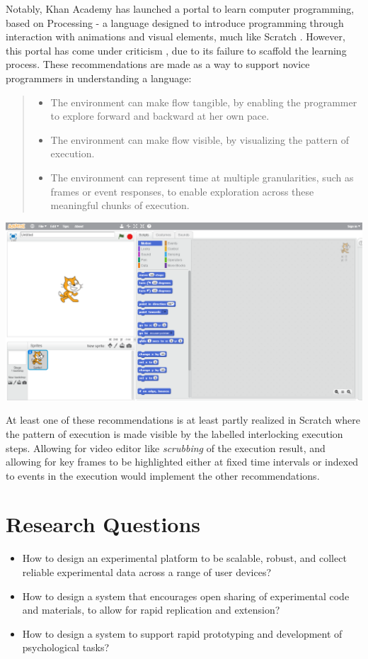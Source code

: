 \documentclass[12pt,a4paper,titlepage]{scrreprt}
\begin{document}
Notably, Khan Academy \parencite{_computer_????} has launched a portal to learn computer programming, based on Processing - a language designed to introduce programming through interaction with animations and visual elements, much like Scratch \parencite{peppler_supergoo_2007}. However, this portal has come under criticism \parencite{victor_learnable_2012}, due to its failure to scaffold the learning process. These recommendations are made as a way to support novice programmers in understanding a language:
\begin{quote}
\begin{itemize}
\item The environment can make flow tangible, by enabling the programmer to explore forward and backward at her own pace.
\item The environment can make flow visible, by visualizing the pattern of execution.
\item The environment can represent time at multiple granularities, such as frames or event responses, to enable exploration across these meaningful chunks of execution.
\end{itemize}
\end{quote}
\includegraphics[scale=0.4]{Scratch_Layout}

At least one of these recommendations is at least partly realized in Scratch where the pattern of execution is made visible by the labelled interlocking execution steps. Allowing for video editor like \textit{scrubbing} of the execution result, and allowing for key frames to be highlighted either at fixed time intervals or indexed to events in the execution would implement the other recommendations.
\chapter{Research Questions}
\begin{itemize}
\item How to design an experimental platform to be scalable, robust, and collect reliable experimental data across a range of user devices?
\item How to design a system that encourages open sharing of experimental code and materials, to allow for rapid replication and extension?
\item How to design a system to support rapid prototyping and development of psychological tasks?
\end{itemize}
\end{document}
